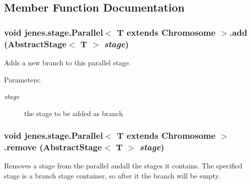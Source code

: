 \subsection{Member Function Documentation}
\hypertarget{classjenes_1_1stage_1_1_parallel_3_01_t_01extends_01_chromosome_01_4_fe3cf6bd36f7e0f7246cbf609d9cbdf2}{
\subsubsection[add]{\setlength{\rightskip}{0pt plus 5cm}void jenes.stage.Parallel$<$ T extends Chromosome $>$.add (AbstractStage$<$ T $>$ {\em stage})}}
\label{classjenes_1_1stage_1_1_parallel_3_01_t_01extends_01_chromosome_01_4_fe3cf6bd36f7e0f7246cbf609d9cbdf2}


Adds a new branch to this parallel stage. 

\begin{Desc}
\item[Parameters:]
\begin{description}
\item[{\em stage}]the stage to be added as branch \end{description}
\end{Desc}
\hypertarget{classjenes_1_1stage_1_1_parallel_3_01_t_01extends_01_chromosome_01_4_db15ae336a8829eb0a8f984eb7aac3ca}{
\subsubsection[remove]{\setlength{\rightskip}{0pt plus 5cm}void jenes.stage.Parallel$<$ T extends Chromosome $>$.remove (AbstractStage$<$ T $>$ {\em stage})}}
\label{classjenes_1_1stage_1_1_parallel_3_01_t_01extends_01_chromosome_01_4_db15ae336a8829eb0a8f984eb7aac3ca}


Removes a stage from the parallel andall the stages it contains. The specified stage is a branch stage container, so after it the branch will be empty. 

